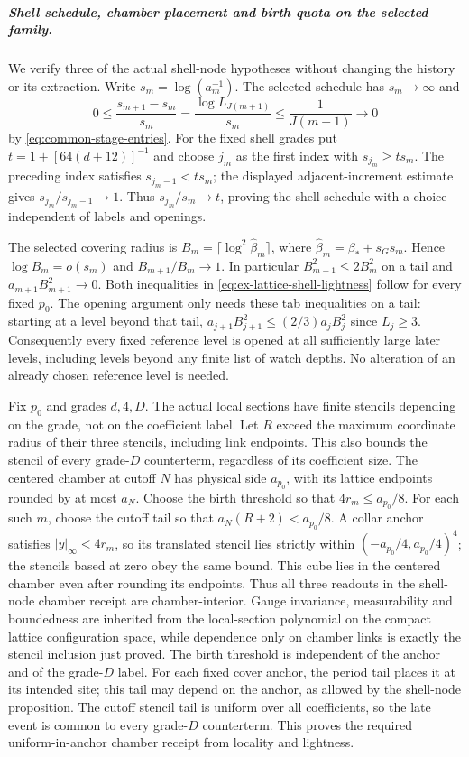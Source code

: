 \subparagraph{Shell schedule, chamber placement and birth quota on the selected family.}\label{par:shell-actual-placement}
We verify three of the actual shell-node hypotheses without changing the
history or its extraction. Write $s_m=\log(a_m^{-1})$. The selected
schedule has $s_m\to\infty$ and
\[
 0\le\frac{s_{m+1}-s_m}{s_m}
 =\frac{\log L_{J(m+1)}}{s_m}\le\frac1{J(m+1)}\longrightarrow0
\]
by \eqref{eq:common-stage-entries}. For the fixed shell grades put
$t=1+[64(d+12)]^{-1}$ and choose $j_m$ as the first index with
$s_{j_m}\ge t s_m$. The preceding index satisfies $s_{j_m-1}<ts_m$;
the displayed adjacent-increment estimate gives
$s_{j_m}/s_{j_m-1}\to1$. Thus $s_{j_m}/s_m\to t$, proving the
shell schedule with a choice independent of labels and openings.

The selected covering radius is $B_m=\lceil\log^2\widehat\beta_m\rceil$,
where $\widehat\beta_m=\beta_*+s_Gs_m$. Hence
$\log B_m=o(s_m)$ and $B_{m+1}/B_m\to1$. In particular
$B_{m+1}^2\le2B_m^2$ on a tail and
$a_{m+1}B_{m+1}^2\to0$. Both inequalities in
\eqref{eq:ex-lattice-shell-lightness} follow for every fixed $p_0$.
The opening argument only needs these tab inequalities on a tail:
starting at a level beyond that tail,
$a_{j+1}B_{j+1}^2\le(2/3)a_jB_j^2$ since $L_j\ge3$.
Consequently every fixed reference level is opened at all sufficiently
large later levels, including levels beyond any finite list of watch
depths. No alteration of an already chosen reference level is needed.

Fix $p_0$ and grades $d,4,D$. The actual local sections have finite
stencils depending on the grade, not on the coefficient label. Let $R$
exceed the maximum coordinate radius of their three stencils, including
link endpoints. This also bounds the stencil of every grade-$D$
counterterm, regardless of its coefficient size. The centered chamber
at cutoff $N$ has physical side $a_{p_0}$, with its lattice endpoints
rounded by at most $a_N$. Choose the birth threshold so that
$4r_m\le a_{p_0}/8$. For each such $m$, choose the cutoff tail so that
$a_N(R+2)<a_{p_0}/8$. A collar anchor satisfies
$|y|_\infty<4r_m$, so its translated stencil lies strictly within
$(-a_{p_0}/4,a_{p_0}/4)^4$; the stencils based at zero obey the same
bound. This cube lies in the centered chamber even after rounding its
endpoints. Thus all three readouts in the shell-node chamber receipt
are chamber-interior. Gauge invariance, measurability and boundedness
are inherited from the local-section polynomial on the compact lattice
configuration space, while dependence only on chamber links is exactly
the stencil inclusion just proved. The birth threshold is independent
of the anchor and of the grade-$D$ label. For each fixed cover anchor,
the period tail places it at its intended site; this tail may depend
on the anchor, as allowed by the shell-node proposition. The cutoff
stencil tail is uniform over all coefficients, so the late event is
common to every grade-$D$ counterterm. This proves the required
uniform-in-anchor chamber receipt from locality and lightness.

